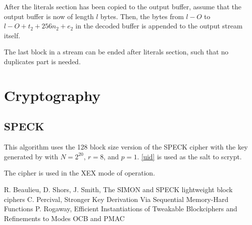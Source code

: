 \documentclass[11pt,a4paper]{report}
\begin{document}
        After the literals section has been copied to the output buffer, assume
        that the output buffer is now of length $l$ bytes. Then, the bytes from
        $l - O$ to $l - O + t_2 + 256n_2 + e_2$ in the decoded buffer is
        appended to the output stream itself.

        The last block in a stream can be ended after literals section, such
        that no duplicates part is needed.

    \section{Cryptography}
        \subsection{SPECK}
        \label{algorithm:speck}
        This algorithm uses the 128 block size version of the SPECK
        cipher\cite{speck} with the key generated by \cite{scrypt} with $N =
        2^{20}$, $r = 8$, and $p = 1$. \ref{uid} is used as the salt to scrypt.

        The cipher is used in the XEX mode of operation\cite{xex}.

    \begin{thebibliography}{9}
        R. Beaulieu, D. Shors, J. Smith, The SIMON and SPECK lightweight block ciphers
        C. Percival, Stronger Key Derivation Via Sequential Memory-Hard Functions
        P. Rogaway, Efficient Instantiations of Tweakable Blockciphers and Refinements to Modes OCB and PMAC
    \end{thebibliography}
\end{document}
